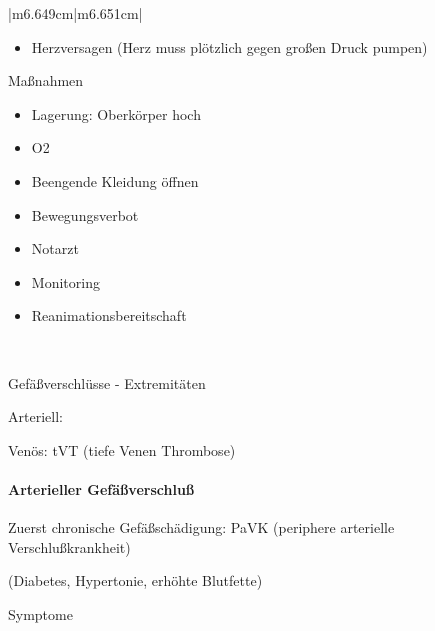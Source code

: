 \documentclass{article}
\begin{document}
\begin{center}
\begin{supertabular}{|m{6.649cm}|m{6.651cm}|}
\begin{itemize}
\item Herzversagen (Herz muss pl\"otzlich gegen gro{\ss}en Druck pumpen)

\end{itemize}
Ma{\ss}nahmen

\begin{itemize}
\item Lagerung: Oberk\"orper hoch

\item O2 

\item Beengende Kleidung \"offnen

\item Bewegungsverbot

\item Notarzt

\item Monitoring

\item Reanimationsbereitschaft

\end{itemize}
\\\hline
\end{supertabular}
\end{center}
Gef\"a{\ss}verschl\"usse - Extremit\"aten

Arteriell:  

Ven\"os:   tVT (tiefe Venen Thrombose)

\paragraph{Arterieller Gef\"a{\ss}verschlu{\ss}}
Zuerst chronische Gef\"a{\ss}sch\"adigung: PaVK
(periphere
arterielle  Verschlu{\ss}krankheit)

(Diabetes, Hypertonie, erh\"ohte Blutfette)

Symptome
\end{document}
